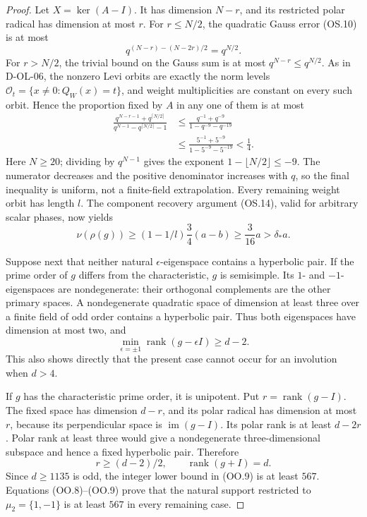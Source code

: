 \begin{proof}
Let $X=\ker(A-I)$.  It has dimension $N-r$, and its restricted
polar radical has dimension at most $r$.  For $r\le N/2$, the
quadratic Gauss error (OS.10) is at most
\[
              q^{(N-r)-(N-2r)/2}=q^{N/2}.
\]
For $r>N/2$, the trivial bound on the Gauss sum is at most
$q^{N-r}\le q^{N/2}$.  As in D-OL-06, the nonzero Levi orbits
are exactly the norm levels
$\mathcal O_t=\{x\ne0:Q_W(x)=t\}$, and weight multiplicities
are constant on every such orbit.  Hence the proportion fixed
by $A$ in any one of them is at most
\[
 \begin{split}
 \frac{q^{N-r-1}+q^{\lceil N/2\rceil}}
      {q^{N-1}-q^{\lceil N/2\rceil}-1}
 &\le \frac{q^{-1}+q^{-9}}{1-q^{-9}-q^{-19}}\\
 &\le \frac{5^{-1}+5^{-9}}{1-5^{-9}-5^{-19}}<\frac14.
 \end{split}                                                 \tag{OO.6}
\]
Here $N\ge20$; dividing by $q^{N-1}$ gives the exponent
$1-\lfloor N/2\rfloor\le-9$.  The numerator decreases and
the positive denominator increases with $q$, so the final
inequality is uniform, not a finite-field extrapolation.
Every remaining weight orbit has length $l$.  The component
recovery argument (OS.14), valid for arbitrary scalar phases,
now yields
\[
           \nu(\rho(g))\ge(1-1/l)\frac34(a-b)
                           \ge\frac3{16}a>\delta_*a.        \tag{OO.7}
\]

Suppose next that neither natural $\epsilon$-eigenspace contains
a hyperbolic pair.  If the prime order of $g$ differs from the
characteristic, $g$ is semisimple.  Its $1$- and $-1$-eigenspaces
are nondegenerate: their orthogonal complements are the other
primary spaces.  A nondegenerate quadratic space of dimension
at least three over a finite field of odd order contains a
hyperbolic pair.  Thus both eigenspaces have dimension at most
two, and
\[
            \min_{\epsilon=\pm1}\operatorname{rank}
                      (g-\epsilon I)\ge d-2.               \tag{OO.8}
\]
This also shows directly that the present case cannot occur for
an involution when $d>4$.

If $g$ has the characteristic prime order, it is unipotent.
Put $r=\operatorname{rank}(g-I)$.  The fixed space has dimension
$d-r$, and its polar radical has dimension at most $r$, because
its perpendicular space is $\operatorname{im}(g-I)$.
Its polar rank is at least $d-2r$.  Polar rank at least three
would give a nondegenerate three-dimensional subspace and hence
a fixed hyperbolic pair.  Therefore
\[
          r\ge(d-2)/2,\qquad \operatorname{rank}(g+I)=d.
                                                               \tag{OO.9}
\]
Since $d\ge1135$ is odd, the integer lower bound in (OO.9)
is at least $567$.  Equations (OO.8)--(OO.9) prove that the
natural support restricted to $\mu_2=\{1,-1\}$ is at least
$567$ in every remaining case.


\end{proof}
